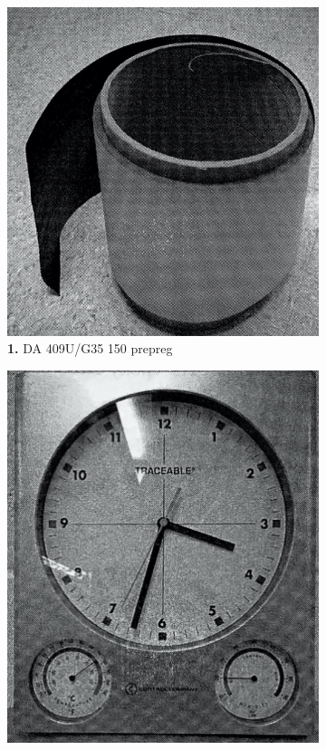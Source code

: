 \begin{figure}[!h]
  \begin{subfigure}[t]{.4\textwidth}
    \centering
    \includegraphics[width=\linewidth]{Pictures/Apparatus/Experiment 1/one.png}
    \caption{\textbf{1.} DA 409U/G35 150 prepreg}
  \end{subfigure}
  \hfill
  \begin{subfigure}[t]{.4\textwidth}
    \centering
    \includegraphics[width=\linewidth]{Pictures/Apparatus/Experiment 1/two.png}

\end{subfigure}
\end{figure}
